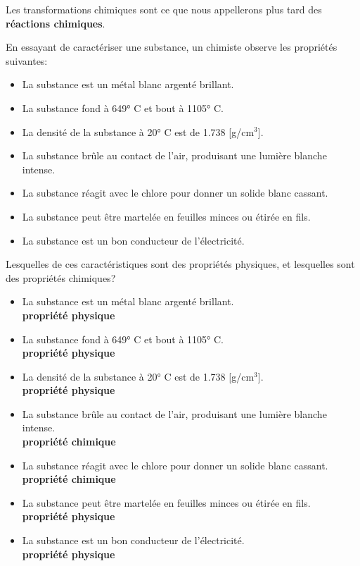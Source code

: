 \documentclass[
  11pt,
  french,
  a4paper,
  openany]{book}
\providecommand{\tightlist}{%
  \setlength{\itemsep}{0pt}\setlength{\parskip}{0pt}}
\begin{document}
Les transformations chimiques sont ce que nous appellerons plus tard des \textbf{réactions chimiques}.

\begin{Exercise}
En essayant de caractériser une substance, un chimiste observe les propriétés suivantes:

\begin{itemize}
\tightlist
\item
  La substance est un métal blanc argenté brillant.
\item
  La substance fond à 649° C et bout à 1105° C.
\item
  La densité de la substance à 20° C est de 1.738 {[}g/cm\(^3\){]}.
\item
  La substance brûle au contact de l'air, produisant une lumière blanche intense.
\item
  La substance réagit avec le chlore pour donner un solide blanc cassant.
\item
  La substance peut être martelée en feuilles minces ou étirée en fils.
\item
  La substance est un bon conducteur de l'électricité.
\end{itemize}

Lesquelles de ces caractéristiques sont des propriétés physiques, et lesquelles sont des propriétés chimiques?

\end{Exercise}

\begin{Answer}

\begin{itemize}
\tightlist
\item
  La substance est un métal blanc argenté brillant.\\
  \textbf{propriété physique}
\item
  La substance fond à 649° C et bout à 1105° C.\\
  \textbf{propriété physique}
\item
  La densité de la substance à 20° C est de 1.738 {[}g/cm\(^3\){]}.\\
  \textbf{propriété physique}
\item
  La substance brûle au contact de l'air, produisant une lumière blanche intense.\\
  \textbf{propriété chimique}
\item
  La substance réagit avec le chlore pour donner un solide blanc cassant.\\
  \textbf{propriété chimique}
\item
  La substance peut être martelée en feuilles minces ou étirée en fils.\\
  \textbf{propriété physique}
\item
  La substance est un bon conducteur de l'électricité.\\
  \textbf{propriété physique}
\end{itemize}


\end{Answer}
\end{document}
